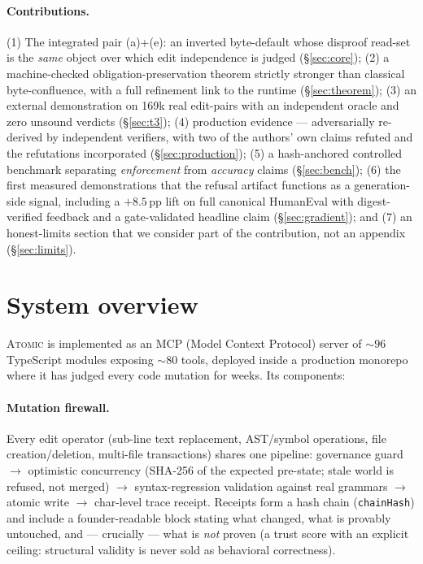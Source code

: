 \documentclass[11pt]{article}
\begin{document}
\paragraph{Contributions.} (1) The integrated pair (a)+(e): an inverted
byte-default whose disproof read-set is the \emph{same} object over which edit
independence is judged (\S\ref{sec:core}); (2) a machine-checked
obligation-preservation theorem strictly stronger than classical byte-confluence,
with a full refinement link to the runtime (\S\ref{sec:theorem}); (3) an external
demonstration on 169k real edit-pairs with an independent oracle and zero unsound
verdicts (\S\ref{sec:t3}); (4) production evidence --- adversarially re-derived by
independent verifiers, with two of the authors' own claims refuted and the
refutations incorporated (\S\ref{sec:production}); (5) a hash-anchored controlled
benchmark separating \emph{enforcement} from \emph{accuracy} claims
(\S\ref{sec:bench}); (6) the first measured demonstrations that the refusal
artifact functions as a generation-side signal, including a $+8.5$\,pp lift on
full canonical HumanEval with digest-verified feedback and a gate-validated
headline claim (\S\ref{sec:gradient}); and (7) an honest-limits section that we
consider part of the contribution, not an appendix (\S\ref{sec:limits}).

\section{System overview}\label{sec:system}

\textsc{Atomic} is implemented as an MCP (Model Context Protocol) server of
${\sim}96$ TypeScript modules exposing ${\sim}80$ tools, deployed inside a
production monorepo where it has judged every code mutation for weeks. Its
components:

\paragraph{Mutation firewall.} Every edit operator (sub-line text replacement,
AST/symbol operations, file creation/deletion, multi-file transactions) shares one
pipeline: governance guard $\to$ optimistic concurrency (SHA-256 of the expected
pre-state; stale world is refused, not merged) $\to$ syntax-regression validation
against real grammars $\to$ atomic write $\to$ char-level trace receipt. Receipts
form a hash chain (\texttt{chainHash}) and include a founder-readable block
stating what changed, what is provably untouched, and --- crucially --- what is
\emph{not} proven (a trust score with an explicit ceiling: structural validity is
never sold as behavioral correctness).
\end{document}
